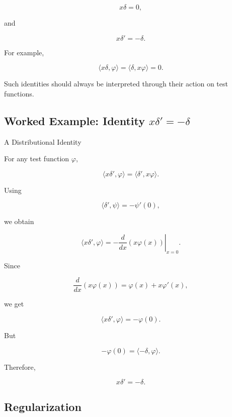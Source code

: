 \[
\boxed{
x\delta=0,
}
\]

and

\[
\boxed{
x\delta'=-\delta.
}
\]

For example,

\[
\langle x\delta,\varphi\rangle
=
\langle\delta,x\varphi\rangle
=
0.
\]

Such identities should always be interpreted through their action on
test functions.

\subsection{Worked Example: Identity \(x\delta'=-\delta\)}
\label{subsec:worked-x-delta-prime}

\begin{workedexamplebox}{A Distributional Identity}

For any test function \(\varphi\),

\[
\langle x\delta',\varphi\rangle
=
\langle\delta',x\varphi\rangle.
\]

Using

\[
\langle\delta',\psi\rangle
=
-\psi'(0),
\]

we obtain

\[
\langle x\delta',\varphi\rangle
=
-
\left.
\frac{d}{dx}
(x\varphi(x))
\right|_{x=0}.
\]

Since

\[
\frac{d}{dx}
(x\varphi(x))
=
\varphi(x)+x\varphi'(x),
\]

we get

\[
\langle x\delta',\varphi\rangle
=
-\varphi(0).
\]

But

\[
-\varphi(0)
=
\langle-\delta,\varphi\rangle.
\]

Therefore,

\begin{answerbox}
\[
\boxed{
x\delta'=-\delta.
}
\]
\end{answerbox}

\end{workedexamplebox}

\subsection{Regularization}
\label{subsec:distribution-regularization}


